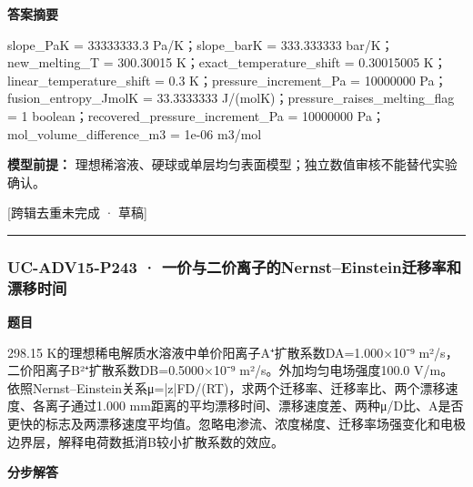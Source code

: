 \documentclass[UTF8,11pt,a4paper]{ctexart}
\begin{document}
\noindent\textbf{答案摘要}\par
slope\_PaK = 33333333.3 Pa/K；slope\_barK = 333.333333 bar/K；new\_melting\_T = 300.30015 K；exact\_temperature\_shift = 0.30015005 K；linear\_temperature\_shift = 0.3 K；pressure\_increment\_Pa = 10000000 Pa；fusion\_entropy\_JmolK = 33.3333333 J/(molK)；pressure\_raises\_melting\_flag = 1 boolean；recovered\_pressure\_increment\_Pa = 10000000 Pa；mol\_volume\_difference\_m3 = 1e-06 m3/mol\par
\noindent\textbf{模型前提：}
理想稀溶液、硬球或单层均匀表面模型；独立数值审核不能替代实验确认。\par
\noindent\textcolor{red!65!black}{[跨辑去重未完成 · 草稿]} \par
\medskip\hrule\medskip
{}
\subsubsection*{UC-ADV15-P243 · 一价与二价离子的Nernst–Einstein迁移率和漂移时间}
\noindent\textbf{题目}\par
298.15 K的理想稀电解质水溶液中单价阳离子A⁺扩散系数DA=1.000×10⁻⁹ m²/s，二价阳离子B²⁺扩散系数DB=0.5000×10⁻⁹ m²/s。外加均匀电场强度100.0 V/m。依照Nernst–Einstein关系μ=|z|FD/(RT)，求两个迁移率、迁移率比、两个漂移速度、各离子通过1.000 mm距离的平均漂移时间、漂移速度差、两种μ/D比、A是否更快的标志及两漂移速度平均值。忽略电渗流、浓度梯度、迁移率场强变化和电极边界层，解释电荷数抵消B较小扩散系数的效应。\par
\medskip\noindent\textbf{分步解答}
\end{document}
